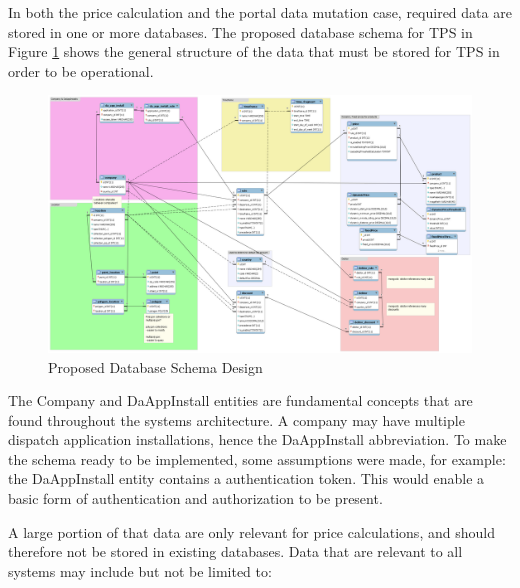 In both the price calculation and the portal data mutation case, required data are stored in one or more databases. The proposed database schema for TPS in Figure \ref{fig:Schema} shows the general structure of the data that must be stored for TPS in order to be operational.

\begin{figure}[ht!]
	\centering
	\includegraphics[width=1\textwidth]{Schema}
	\caption[Database Schema]{Proposed Database Schema Design}
	\label{fig:Schema}
\end{figure}

The Company and DaAppInstall entities are fundamental concepts that are found throughout the systems architecture. A company may have multiple dispatch application installations, hence the DaAppInstall abbreviation. To make the schema ready to be implemented, some assumptions were made, for example: the DaAppInstall entity contains a authentication token. This would enable a basic form of authentication and authorization to be present.

A large portion of that data are only relevant for price calculations, and should therefore not be stored in existing databases. Data that are relevant to all systems may include but not be limited to:

